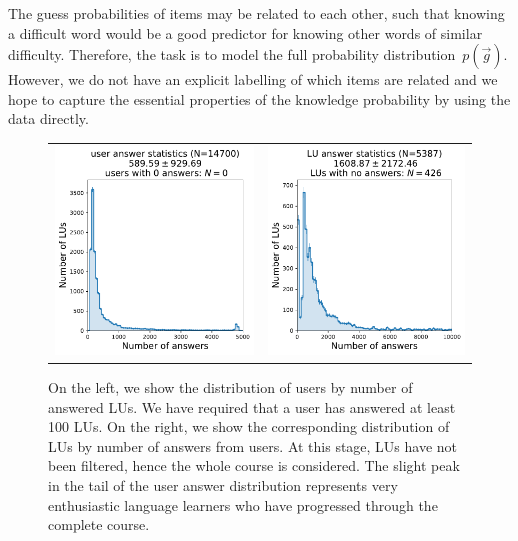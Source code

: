 The guess probabilities of items may be related to each other, such that knowing a difficult word would be a good predictor for knowing other words of similar difficulty. Therefore, the task is to model the full probability distribution~$p(\vec{g})$. However, we do not have an explicit labelling of which items are related and we hope to capture the essential properties of the knowledge probability by using the data directly.

\begin{figure}[ht]
\centering
\begin{tabular}{cc}
\includegraphics[width=0.5\linewidth]{figures/lingvist/user_answer_distribution.pdf} &
\includegraphics[width=0.5\linewidth]{figures/lingvist/lu_answer_distribution.pdf} \\
\end{tabular}
\caption[Distributions of guesses by LU and user]{On the left, we show the distribution of users by number of answered LUs. We have required that a user has answered at least 100 LUs. On the right, we show the corresponding distribution of LUs by number of answers from users. At this stage, LUs have not been filtered, hence the whole course is considered. The slight peak in the tail of the user answer distribution represents very enthusiastic language learners who have progressed through the complete course.} 
\label{fig:user_lu_distribution} 
\end{figure} 


